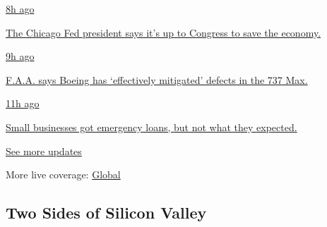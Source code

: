 \href{https://www.nytimes.com/live/2020/08/03/business/stock-market-today-coronavirus?action=click\&pgtype=Article\&state=default\&region=MAIN_CONTENT_1\&context=storylines_live_updates\#the-chicago-fed-president-says-its-up-to-congress-to-save-the-economy}{8h
ago}

\href{https://www.nytimes.com/live/2020/08/03/business/stock-market-today-coronavirus?action=click\&pgtype=Article\&state=default\&region=MAIN_CONTENT_1\&context=storylines_live_updates\#the-chicago-fed-president-says-its-up-to-congress-to-save-the-economy}{The
Chicago Fed president says it's up to Congress to save the economy.}

\href{https://www.nytimes.com/live/2020/08/03/business/stock-market-today-coronavirus?action=click\&pgtype=Article\&state=default\&region=MAIN_CONTENT_1\&context=storylines_live_updates\#faa-says-boeing-has-effectively-mitigated-defects-in-the-737-max}{9h
ago}

\href{https://www.nytimes.com/live/2020/08/03/business/stock-market-today-coronavirus?action=click\&pgtype=Article\&state=default\&region=MAIN_CONTENT_1\&context=storylines_live_updates\#faa-says-boeing-has-effectively-mitigated-defects-in-the-737-max}{F.A.A.
says Boeing has `effectively mitigated' defects in the 737 Max.}

\href{https://www.nytimes.com/live/2020/08/03/business/stock-market-today-coronavirus?action=click\&pgtype=Article\&state=default\&region=MAIN_CONTENT_1\&context=storylines_live_updates\#small-businesses-got-emergency-loans-but-not-what-they-expected}{11h
ago}

\href{https://www.nytimes.com/live/2020/08/03/business/stock-market-today-coronavirus?action=click\&pgtype=Article\&state=default\&region=MAIN_CONTENT_1\&context=storylines_live_updates\#small-businesses-got-emergency-loans-but-not-what-they-expected}{Small
businesses got emergency loans, but not what they expected.}

\href{https://www.nytimes.com/live/2020/08/03/business/stock-market-today-coronavirus?action=click\&pgtype=Article\&state=default\&region=MAIN_CONTENT_1\&context=storylines_live_updates}{See
more updates}

More live coverage:
\href{https://www.nytimes.com/2020/08/03/world/coronavirus-covid-19.html?action=click\&pgtype=Article\&state=default\&region=MAIN_CONTENT_1\&context=storylines_live_updates}{Global}

\hypertarget{two-sides-of-silicon-valley}{%
\subsection{Two Sides of Silicon
Valley}\label{two-sides-of-silicon-valley}}

